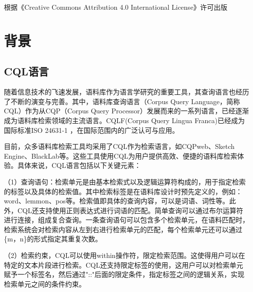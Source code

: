 \documentclass[11pt]{article}
\begin{document}
\begin{CJK*}{UTF8}{gbsn}
{    \noindent 根据《Creative Commons Attribution 4.0 International License》许可出版
}

\section{背景}
\label{backgound}

\subsection{CQL语言}

随着信息技术的飞速发展，语料库作为语言学研究的重要工具，其查询语言也经历了不断的演变与完善。其中，语料库查询语言（Corpus Query Language，简称CQL）作为从CQP（Corpus Query Processor）发展而来的一系列语言，已经逐渐成为语料库检索领域的主流语言。CQLF(Corpus Query Lingua Franca)已经成为国际标准ISO 24631-1 \cite{banski-etal-2016-corpus}，在国际范围内的广泛认可与应用。

目前，众多语料库检索工具均采用了CQL作为检索语言，如CQPweb\cite{hardie2012cqpweb}、Sketch Engine\cite{sketchengine1}、BlackLab\cite{blacklab}等。这些工具使用CQL为用户提供高效、便捷的语料库检索体验。具体来说，CQL语言包括以下关键元素：

（1）查询语句：检索单元是由基本检索式以及逻辑运算符构成的，用于指定检索的标签以及具体的检索值。其中检索标签是在语料库设计时预先定义的，例如：word、lemmon、pos等。检索值即具体的查询内容，可以是词语、词性等。此外，CQL还支持使用正则表达式进行词语的匹配。简单查询可以通过布尔运算符进行连接，组成复合查询。一条查询语句可以包含多个检索单元，在语料匹配时，检索系统会对检索内容从左到右进行检索单元的匹配，每个检索单元还可以通过\{m，n\}的形式指定其重复次数。

（2）检索约束，CQL可以使用within操作符，限定检索范围。这使得用户可以在特定的文本片段进行检索。CQL还支持限定标签的使用，这用户可以对检索单元赋予一个标签名，然后通过"::"后面的限定条件，指定标签之间的逻辑关系，实现检索单元之间的条件约束。


\end{CJK*}
\end{document}
